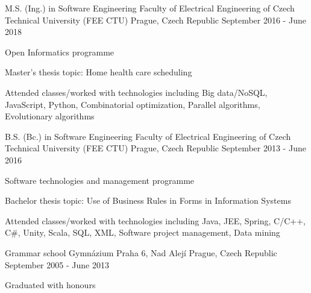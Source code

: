 \begin{cventries}
        \cventry
            {M.S. (Ing.) in Software Engineering}
            {Faculty of Electrical Engineering of Czech Technical University (FEE CTU)}
            {Prague, Czech Republic}
            {September 2016 - June 2018}
            {
              \begin{cvitems}
                \item {Open Informatics programme}
                \item {Master's thesis topic: Home health care scheduling}
                \item {Attended classes/worked with technologies including Big data/NoSQL, JavaScript, Python, Combinatorial optimization, Parallel algorithms, Evolutionary algorithms}
              \end{cvitems}
            }
        \cventry
                {B.S. (Bc.) in Software Engineering}
                {Faculty of Electrical Engineering of Czech Technical University (FEE CTU)}
                {Prague, Czech Republic}
                {September 2013 - June 2016}
                {
                  \begin{cvitems}
                    \item {Software technologies and management programme}
                    \item {Bachelor thesis topic: Use of Business Rules in Forms in Information Systems}
                    \item {Attended classes/worked with technologies including Java, JEE, Spring, C/C++, C\#, Unity, Scala, SQL, XML, Software project management, Data mining}
                  \end{cvitems}
                }
        \cventry
                {Grammar school}
                {Gymn\'{a}zium Praha 6, Nad Alej\'{i}}
                {Prague, Czech Republic}
                {September 2005 - June 2013}
                {
                  \begin{cvitems}
                    \item {Graduated with honours}
                  \end{cvitems}
                }
\end{cventries}
